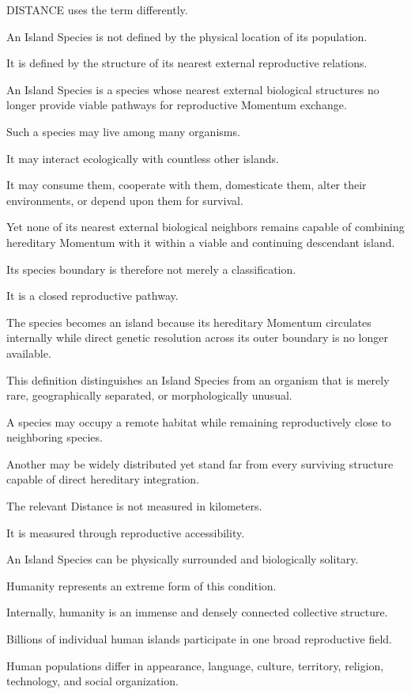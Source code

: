 DISTANCE uses the term differently.

An Island Species is not defined by the physical location of its population.

It is defined by the structure of its nearest external reproductive relations.

An Island Species is a species whose nearest external biological structures no longer provide viable pathways for reproductive Momentum exchange.

Such a species may live among many organisms.

It may interact ecologically with countless other islands.

It may consume them, cooperate with them, domesticate them, alter their environments, or depend upon them for survival.

Yet none of its nearest external biological neighbors remains capable of combining hereditary Momentum with it within a viable and continuing descendant island.

Its species boundary is therefore not merely a classification.

It is a closed reproductive pathway.

The species becomes an island because its hereditary Momentum circulates internally while direct genetic resolution across its outer boundary is no longer available.

This definition distinguishes an Island Species from an organism that is merely rare, geographically separated, or morphologically unusual.

A species may occupy a remote habitat while remaining reproductively close to neighboring species.

Another may be widely distributed yet stand far from every surviving structure capable of direct hereditary integration.

The relevant Distance is not measured in kilometers.

It is measured through reproductive accessibility.

An Island Species can be physically surrounded and biologically solitary.

Humanity represents an extreme form of this condition.

Internally, humanity is an immense and densely connected collective structure.

Billions of individual human islands participate in one broad reproductive field.

Human populations differ in appearance, language, culture, territory, religion, technology, and social organization.

